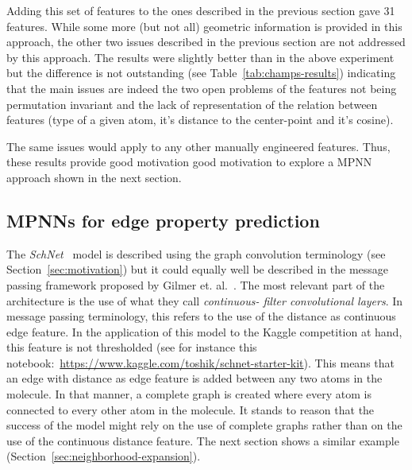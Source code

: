 Adding this set of features to the ones described in the previous section gave 31 features. While some more (but not all) geometric information is provided in this approach, the other two issues described in the previous section are not addressed by this approach. The results were slightly better than in the above experiment but the difference is not outstanding (see Table~\ref{tab:champs-results}) indicating that the main issues are indeed the two open problems of the features not being permutation invariant and the lack of representation of the relation between features (type of a given atom, it's distance to the center-point and it's cosine).

The same issues would apply to any other manually engineered features. Thus, these results provide good motivation good motivation to explore a MPNN approach shown in the next section.


\subsection{MPNNs for edge property prediction}
\label{sec:schnet}

The \textit{SchNet}~\cite{Schutt2017} model is described using the graph convolution terminology (see Section~\ref{sec:motivation}) but it could equally well be described in the message passing framework proposed by Gilmer et. al.~\cite{Gilmer2017}. The most relevant part of the architecture is the use of what they call \textit{continuous- filter convolutional layers}. In message passing terminology, this refers to the use of the distance as continuous edge feature. In the application of this model to the Kaggle competition at hand, this feature is not thresholded (see for instance this notebook:~\url{https://www.kaggle.com/toshik/schnet-starter-kit}). This means that an edge with distance as edge feature is added between any two atoms in the molecule. In that manner, a complete graph is created where every atom is connected to every other atom in the molecule. It stands to reason that the success of the model might rely on the use of complete graphs rather than on the use of the continuous distance feature. The next section shows a similar example (Section~\ref{sec:neighborhood-expansion}).

